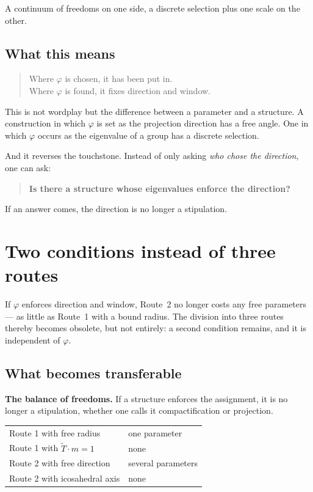 A continuum of freedoms on one side, a discrete selection plus one
scale on the other.

\section{What this means}

\begin{quote}
Where $\varphi$ is chosen, it has been put in.\\
Where $\varphi$ is found, it fixes direction and window.
\end{quote}

This is not wordplay but the difference between a parameter and a
structure. A construction in which $\varphi$ is set as the projection
direction has a free angle. One in which $\varphi$ occurs as the
eigenvalue of a group has a discrete selection.

And it reverses the touchstone. Instead of only asking \emph{who chose
the direction}, one can ask:

\begin{quote}
\textbf{Is there a structure whose eigenvalues enforce the direction?}
\end{quote}

If an answer comes, the direction is no longer a stipulation.

\chapter{Two conditions instead of three routes}

If $\varphi$ enforces direction and window, Route~2 no longer costs any
free parameters --- as little as Route~1 with a bound radius. The
division into three routes thereby becomes obsolete, but not entirely:
a second condition remains, and it is independent of $\varphi$.

\section{What becomes transferable}

\textbf{The balance of freedoms.} If a structure enforces the
assignment, it is no longer a stipulation, whether one calls it
compactification or projection.
\begin{center}
\begin{tabular}{ll}
Route 1 with free radius & one parameter \\
Route 1 with $\tilde T \cdot m = 1$ & none \\
Route 2 with free direction & several parameters \\
Route 2 with icosahedral axis & none \\
\end{tabular}
\end{center}

